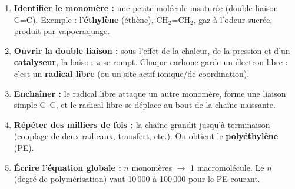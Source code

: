 \documentclass[11pt]{article}
\begin{document}
\begin{methode}
\begin{enumerate}
\item \textbf{Identifier le monomère :} une petite molécule insaturée (double liaison C=C). Exemple : l'\textbf{éthylène} (éthène), CH$_2$=CH$_2$, gaz à l'odeur sucrée, produit par vapocraquage.
\item \textbf{Ouvrir la double liaison :} sous l'effet de la chaleur, de la pression et d'un \textbf{catalyseur}, la liaison $\pi$ se rompt. Chaque carbone garde un électron libre : c'est un \textbf{radical libre} (ou un site actif ionique/de coordination).
\item \textbf{Enchaîner :} le radical libre attaque un autre monomère, forme une liaison simple C--C, et le radical libre se déplace au bout de la chaîne naissante.
\item \textbf{Répéter des milliers de fois :} la chaîne grandit jusqu'à terminaison (couplage de deux radicaux, transfert, etc.). On obtient le \textbf{polyéthylène} (PE).
\item \textbf{Écrire l'équation globale :} $n$ monomères $\to$ 1 macromolécule. Le $n$ (degré de polymérisation) vaut 10\,000 à 100\,000 pour le PE courant.
\end{enumerate}
\end{methode}
\end{document}
